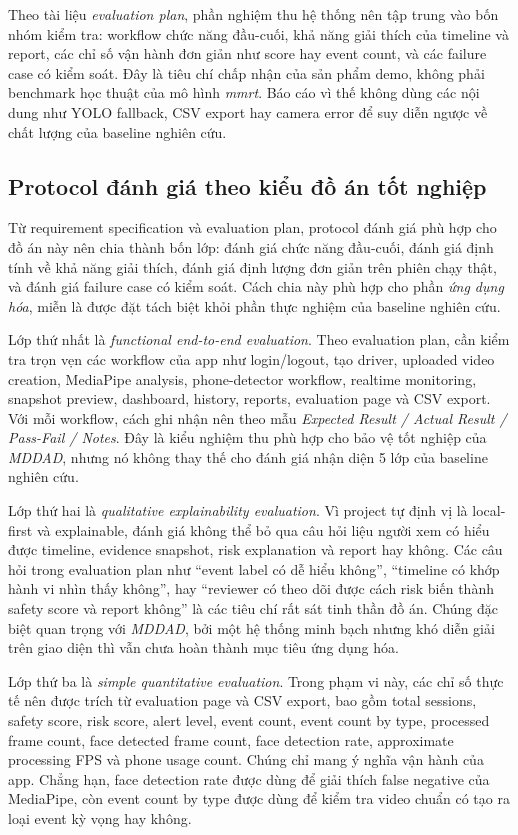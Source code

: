 \documentclass[conference,a4paper]{IEEEtran}
\begin{document}
Theo tài liệu \textit{evaluation plan}, phần nghiệm thu hệ thống nên tập trung vào bốn nhóm kiểm tra: workflow chức năng đầu-cuối, khả năng giải thích của timeline và report, các chỉ số vận hành đơn giản như score hay event count, và các failure case có kiểm soát. Đây là tiêu chí chấp nhận của sản phẩm demo, không phải benchmark học thuật của mô hình \textit{mmrt}. Báo cáo vì thế không dùng các nội dung như YOLO fallback, CSV export hay camera error để suy diễn ngược về chất lượng của baseline nghiên cứu.

\subsection{Protocol đánh giá theo kiểu đồ án tốt nghiệp}
Từ requirement specification và evaluation plan, protocol đánh giá phù hợp cho đồ án này nên chia thành bốn lớp: đánh giá chức năng đầu-cuối, đánh giá định tính về khả năng giải thích, đánh giá định lượng đơn giản trên phiên chạy thật, và đánh giá failure case có kiểm soát. Cách chia này phù hợp cho phần \textit{ứng dụng hóa}, miễn là được đặt tách biệt khỏi phần thực nghiệm của baseline nghiên cứu.

Lớp thứ nhất là \textit{functional end-to-end evaluation}. Theo evaluation plan, cần kiểm tra trọn vẹn các workflow của app như login/logout, tạo driver, uploaded video creation, MediaPipe analysis, phone-detector workflow, realtime monitoring, snapshot preview, dashboard, history, reports, evaluation page và CSV export. Với mỗi workflow, cách ghi nhận nên theo mẫu \textit{Expected Result / Actual Result / Pass-Fail / Notes}. Đây là kiểu nghiệm thu phù hợp cho bảo vệ tốt nghiệp của \textit{MDDAD}, nhưng nó không thay thế cho đánh giá nhận diện 5 lớp của baseline nghiên cứu.

Lớp thứ hai là \textit{qualitative explainability evaluation}. Vì project tự định vị là local-first và explainable, đánh giá không thể bỏ qua câu hỏi liệu người xem có hiểu được timeline, evidence snapshot, risk explanation và report hay không. Các câu hỏi trong evaluation plan như ``event label có dễ hiểu không'', ``timeline có khớp hành vi nhìn thấy không'', hay ``reviewer có theo dõi được cách risk biến thành safety score và report không'' là các tiêu chí rất sát tinh thần đồ án. Chúng đặc biệt quan trọng với \textit{MDDAD}, bởi một hệ thống minh bạch nhưng khó diễn giải trên giao diện thì vẫn chưa hoàn thành mục tiêu ứng dụng hóa.

Lớp thứ ba là \textit{simple quantitative evaluation}. Trong phạm vi này, các chỉ số thực tế nên được trích từ evaluation page và CSV export, bao gồm total sessions, safety score, risk score, alert level, event count, event count by type, processed frame count, face detected frame count, face detection rate, approximate processing FPS và phone usage count. Chúng chỉ mang ý nghĩa vận hành của app. Chẳng hạn, face detection rate được dùng để giải thích false negative của MediaPipe, còn event count by type được dùng để kiểm tra video chuẩn có tạo ra loại event kỳ vọng hay không.
\end{document}
